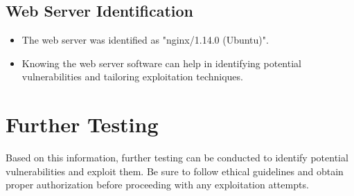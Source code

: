 \documentclass{article}
\begin{document}
\subsection{Web Server Identification}
\begin{itemize}
    \item The web server was identified as "nginx/1.14.0 (Ubuntu)".
    \item Knowing the web server software can help in identifying potential vulnerabilities and tailoring exploitation techniques.
\end{itemize}

\section{Further Testing}

Based on this information, further testing can be conducted to identify potential vulnerabilities and exploit them. Be sure to follow ethical guidelines and obtain proper authorization before proceeding with any exploitation attempts.
\end{document}
